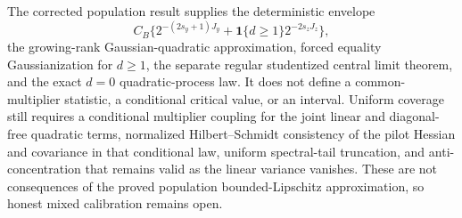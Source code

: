 The corrected population result supplies the deterministic envelope
\[
C_B\{2^{-(2s_y+1)J_y}+\mathbf 1\{d\ge1\}2^{-2s_zJ_z}\},
\]
the growing-rank Gaussian-quadratic approximation, forced equality Gaussianization for \(d\ge1\), the separate regular studentized central limit theorem, and the exact \(d=0\) quadratic-process law. It does not define a common-multiplier statistic, a conditional critical value, or an interval. Uniform coverage still requires a conditional multiplier coupling for the joint linear and diagonal-free quadratic terms, normalized Hilbert--Schmidt consistency of the pilot Hessian and covariance in that conditional law, uniform spectral-tail truncation, and anti-concentration that remains valid as the linear variance vanishes. These are not consequences of the proved population bounded-Lipschitz approximation, so honest mixed calibration remains open.